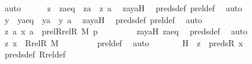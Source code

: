 \begin{isabellebody}
\ auto\isanewline
\ \ \ \ \isamarkupfalse%
\ z\ \ zaeq\ {\isacharcolon}{\kern0pt}\ {\isachardoublequoteopen}za\ {\isacharequal}{\kern0pt}\ {\isacharless}{\kern0pt}z{\isacharcomma}{\kern0pt}\ a{\isachargreater}{\kern0pt}{\isachardoublequoteclose}\ \isamarkupfalse%
\ zayaH\ \isamarkupfalse%
\ preds{\isacharunderscore}{\kern0pt}def\ prel{\isacharunderscore}{\kern0pt}def\ \isamarkupfalse%
\ auto\ \isanewline
\ \ \ \ \isamarkupfalse%
\ y\ \ yaeq\ {\isacharcolon}{\kern0pt}\ {\isachardoublequoteopen}ya\ {\isacharequal}{\kern0pt}\ {\isacharless}{\kern0pt}y{\isacharcomma}{\kern0pt}\ a{\isachargreater}{\kern0pt}{\isachardoublequoteclose}\ \isamarkupfalse%
\ zayaH\ \isamarkupfalse%
\ preds{\isacharunderscore}{\kern0pt}def\ prel{\isacharunderscore}{\kern0pt}def\ \isamarkupfalse%
\ auto\ \isanewline
\isanewline
\ \ \ \ \isamarkupfalse%
\ {\isachardoublequoteopen}{\isacharless}{\kern0pt}{\isacharless}{\kern0pt}z{\isacharcomma}{\kern0pt}\ a{\isachargreater}{\kern0pt}{\isacharcomma}{\kern0pt}\ {\isacharless}{\kern0pt}x{\isacharcomma}{\kern0pt}\ a{\isachargreater}{\kern0pt}{\isachargreater}{\kern0pt}\ {\isasymin}\ prel{\isacharparenleft}{\kern0pt}Rrel{\isacharparenleft}{\kern0pt}R{\isacharcomma}{\kern0pt}\ M{\isacharparenright}{\kern0pt}{\isacharcomma}{\kern0pt}\ p{\isacharparenright}{\kern0pt}{\isachardoublequoteclose}\ \isanewline
\ \ \ \ \ \ \isamarkupfalse%
\ zayaH\ zaeq\ \isamarkupfalse%
\ preds{\isacharunderscore}{\kern0pt}def\ \isamarkupfalse%
\ auto\ \isanewline
\ \ \ \ \isamarkupfalse%
\ \isamarkupfalse%
\ {\isachardoublequoteopen}{\isacharless}{\kern0pt}z{\isacharcomma}{\kern0pt}\ x{\isachargreater}{\kern0pt}\ {\isasymin}\ Rrel{\isacharparenleft}{\kern0pt}R{\isacharcomma}{\kern0pt}\ M{\isacharparenright}{\kern0pt}{\isachardoublequoteclose}\ \isanewline
\ \ \ \ \ \ \isamarkupfalse%
\ prel{\isacharunderscore}{\kern0pt}def\ \isamarkupfalse%
\ auto\isanewline
\ \ \ \ \isamarkupfalse%
\ \isamarkupfalse%
\ H{}\ {\isacharcolon}{\kern0pt}\ {\isachardoublequoteopen}z\ {\isasymin}\ preds{\isacharparenleft}{\kern0pt}R{\isacharcomma}{\kern0pt}\ x{\isacharparenright}{\kern0pt}{\isachardoublequoteclose}\ \isanewline
\ \ \ \ \ \ \isamarkupfalse%
\ preds{\isacharunderscore}{\kern0pt}def\ Rrel{\isacharunderscore}{\kern0pt}def\ \isamarkupfalse%

\end{isabellebody}
